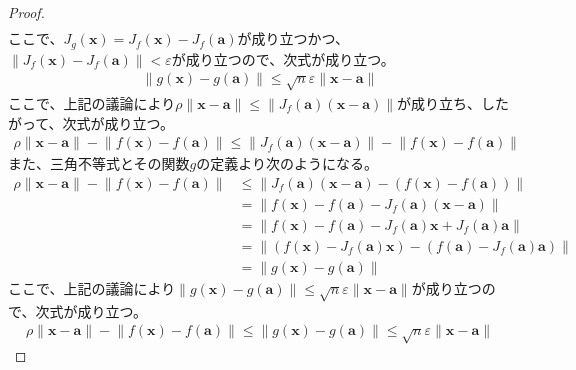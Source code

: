 \documentclass[dvipdfmx]{jsarticle}
\begin{document}
\begin{proof}
\begin{align*}
\end{align*}
ここで、$J_{g}\left( \mathbf{x} \right) = J_{f}\left( \mathbf{x} \right) - J_{f}\left( \mathbf{a} \right)$が成り立つかつ、$\left\| J_{f}\left( \mathbf{x} \right) - J_{f}\left( \mathbf{a} \right) \right\| < \varepsilon$が成り立つので、次式が成り立つ。
\begin{align*}
\left\| g\left( \mathbf{x} \right) - g\left( \mathbf{a} \right) \right\| \leq \sqrt{n}\varepsilon\left\| \mathbf{x} - \mathbf{a} \right\|
\end{align*}
ここで、上記の議論により$\rho\left\| \mathbf{x} - \mathbf{a} \right\| \leq \left\| J_{f}\left( \mathbf{a} \right)\left( \mathbf{x} - \mathbf{a} \right) \right\|$が成り立ち、したがって、次式が成り立つ。
\begin{align*}
\rho\left\| \mathbf{x} - \mathbf{a} \right\| - \left\| f\left( \mathbf{x} \right) - f\left( \mathbf{a} \right) \right\| \leq \left\| J_{f}\left( \mathbf{a} \right)\left( \mathbf{x} - \mathbf{a} \right) \right\| - \left\| f\left( \mathbf{x} \right) - f\left( \mathbf{a} \right) \right\|
\end{align*}
また、三角不等式とその関数$g$の定義より次のようになる。
\begin{align*}
\rho\left\| \mathbf{x} - \mathbf{a} \right\| - \left\| f\left( \mathbf{x} \right) - f\left( \mathbf{a} \right) \right\| &\leq \left\| J_{f}\left( \mathbf{a} \right)\left( \mathbf{x} - \mathbf{a} \right) - \left( f\left( \mathbf{x} \right) - f\left( \mathbf{a} \right) \right) \right\|\\
&= \left\| f\left( \mathbf{x} \right) - f\left( \mathbf{a} \right) - J_{f}\left( \mathbf{a} \right)\left( \mathbf{x} - \mathbf{a} \right) \right\|\\
&= \left\| f\left( \mathbf{x} \right) - f\left( \mathbf{a} \right) - J_{f}\left( \mathbf{a} \right)\mathbf{x} + J_{f}\left( \mathbf{a} \right)\mathbf{a} \right\|\\
&= \left\| \left( f\left( \mathbf{x} \right) - J_{f}\left( \mathbf{a} \right)\mathbf{x} \right) - \left( f\left( \mathbf{a} \right) - J_{f}\left( \mathbf{a} \right)\mathbf{a} \right) \right\|\\
&= \left\| g\left( \mathbf{x} \right) - g\left( \mathbf{a} \right) \right\|
\end{align*}
ここで、上記の議論により$\left\| g\left( \mathbf{x} \right) - g\left( \mathbf{a} \right) \right\| \leq \sqrt{n}\varepsilon\left\| \mathbf{x} - \mathbf{a} \right\|$が成り立つので、次式が成り立つ。
\begin{align*}
\rho\left\| \mathbf{x} - \mathbf{a} \right\| - \left\| f\left( \mathbf{x} \right) - f\left( \mathbf{a} \right) \right\| \leq \left\| g\left( \mathbf{x} \right) - g\left( \mathbf{a} \right) \right\| \leq \sqrt{n}\varepsilon\left\| \mathbf{x} - \mathbf{a} \right\|

\end{align*}
\end{proof}
\end{document}

